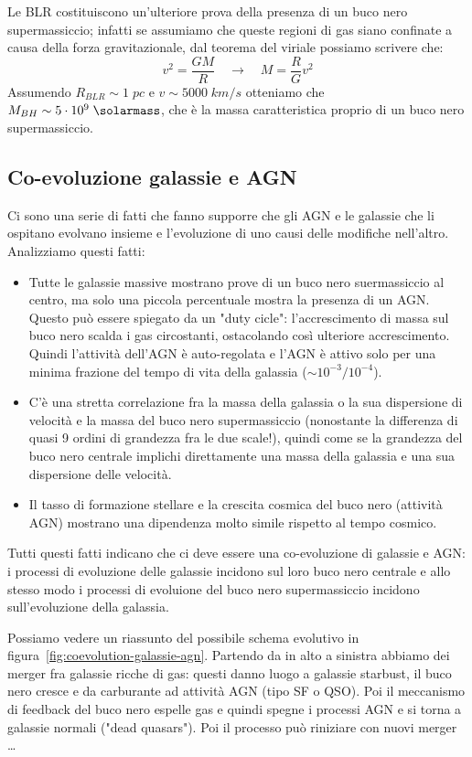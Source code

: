Le BLR costituiscono un'ulteriore prova della presenza di un buco nero supermassiccio; infatti se assumiamo che queste regioni di gas siano confinate a causa della forza gravitazionale, dal teorema del viriale possiamo scrivere che:
\begin{equation*}
    v^2 = \frac{GM}{R} \quad \rightarrow \quad M = \frac{R}{G} v^2
\end{equation*}
Assumendo $R_{BLR}\sim 1 \;\si{pc}$ e $v \sim 5000 \;\si{km}/\si{s}$ otteniamo che $M_{BH} \sim 5 \cdot 10^9 \;\si{\solarmass}$, che è la massa caratteristica proprio di un buco nero supermassiccio.

\subsection{Co-evoluzione galassie e AGN}
Ci sono una serie di fatti che fanno supporre che gli AGN e le galassie che li ospitano evolvano insieme e l'evoluzione di uno causi delle modifiche nell'altro. Analizziamo questi fatti:
\begin{itemize}
    \item Tutte le galassie massive mostrano prove di un buco nero suermassiccio al centro, ma solo una piccola percentuale mostra la presenza di un AGN. Questo può essere spiegato da un "duty cicle": l'accrescimento di massa sul buco nero scalda i gas circostanti, ostacolando così ulteriore accrescimento. Quindi l'attività dell'AGN è auto-regolata e l'AGN è attivo solo per una minima frazione del tempo di vita della galassia ($\sim 10^{-3}/10^{-4}$).
    \item C'è una stretta correlazione fra la massa della galassia o la sua dispersione di velocità e la massa del buco nero supermassiccio (nonostante la differenza di quasi 9 ordini di grandezza fra le due scale!), quindi come se la grandezza del buco nero centrale implichi direttamente una massa della galassia e una sua dispersione delle velocità.
    \item Il tasso di formazione stellare e la crescita cosmica del buco nero (attività AGN) mostrano una dipendenza molto simile rispetto al tempo cosmico.
\end{itemize}

Tutti questi fatti indicano che ci deve essere una co-evoluzione di galassie e AGN: i processi di evoluzione delle galassie incidono sul loro buco nero centrale e allo stesso modo i processi di evoluione del buco nero supermassiccio incidono sull'evoluzione della galassia.

Possiamo vedere un riassunto del possibile schema evolutivo in figura~\ref{fig:coevolution-galassie-agn}. Partendo da in alto a sinistra abbiamo dei merger fra galassie ricche di gas: questi danno luogo a galassie starbust, il buco nero cresce e da carburante ad attività AGN (tipo SF o QSO). Poi il meccanismo di feedback del buco nero espelle gas e quindi spegne i processi AGN e si torna a galassie normali ("dead quasars"). Poi il processo può riniziare con nuovi merger \dots

